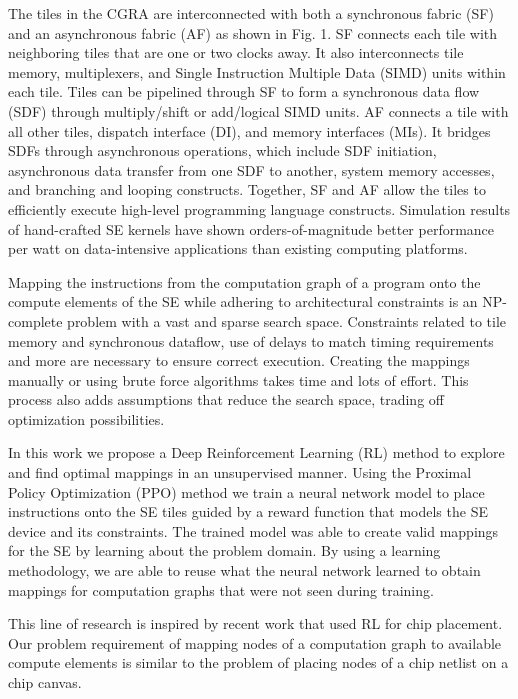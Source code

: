 \documentclass[sigplan,screen]{acmart}
\begin{document}
The tiles in the CGRA are interconnected with both a synchronous fabric (SF) and an asynchronous fabric (AF) as shown in Fig. 1. SF connects each tile with neighboring tiles that are one or two clocks away. It also interconnects tile memory, multiplexers, and Single Instruction Multiple Data (SIMD) units within each tile. Tiles can be pipelined through SF to form a synchronous data flow (SDF) through multiply/shift or add/logical SIMD units. AF connects a tile with all other tiles, dispatch interface (DI), and memory interfaces (MIs). It bridges SDFs through asynchronous operations, which include SDF initiation, asynchronous data transfer from one SDF to another, system memory accesses, and branching and looping constructs. Together, SF and AF allow the tiles to efficiently execute high-level programming language constructs. Simulation results of hand-crafted SE kernels have shown orders-of-magnitude better performance per watt on data-intensive applications than existing computing platforms.

Mapping the instructions from the computation graph of a program onto the compute elements of the SE while adhering to architectural constraints is an NP-complete problem with a vast and sparse search space. Constraints related to tile memory and synchronous dataflow, use of delays to match timing requirements and more are necessary to ensure correct execution. Creating the mappings manually or using brute force algorithms takes time and lots of effort. This process also adds assumptions that reduce the search space, trading off optimization possibilities.  

In this work we propose a Deep Reinforcement Learning (RL) method to explore and find optimal mappings in an unsupervised manner. Using the Proximal Policy Optimization (PPO) method we train a neural network model to place instructions onto the SE tiles guided by a reward function that models the SE device and its constraints. The trained model was able to create valid mappings for the SE by learning about the problem domain. By using a learning methodology, we are able to reuse what the neural network learned to obtain mappings for computation graphs that were not seen during training.  

This line of research is inspired by recent work that used RL for chip placement. Our problem requirement of mapping nodes of a computation graph to available compute elements is similar to the problem of placing nodes of a chip netlist on a chip canvas. 
\end{document}
